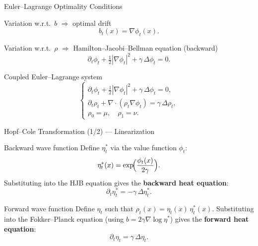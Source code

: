 \documentclass[aspectratio=169]{beamer}
\begin{document}
\begin{frame}{Euler–Lagrange Optimality Conditions}

\begin{block}{Variation w.r.t.\ $b$ $\Rightarrow$ optimal drift}
\[
    b_t(x) = \nabla\phi_t(x).
\]
\end{block}

\begin{block}{Variation w.r.t.\ $\rho$ $\Rightarrow$ Hamilton–Jacobi–Bellman equation (backward)}
\[
    \partial_t\phi_t + \tfrac{1}{2}|\nabla\phi_t|^2 + \gamma\,\Delta\phi_t = 0.
\]
\end{block}

\begin{block}{Coupled Euler–Lagrange system}
\[
\begin{cases}
\displaystyle\partial_t\phi_t + \tfrac{1}{2}|\nabla\phi_t|^2 + \gamma\,\Delta\phi_t = 0, \\[6pt]
\displaystyle\partial_t\rho_t + \nabla\cdot(\rho_t\nabla\phi_t) = \gamma\,\Delta\rho_t, \\[4pt]
\rho_0 = \mu,\quad \rho_1 = \nu.
\end{cases}
\]
\end{block}

\end{frame}

\begin{frame}{Hopf–Cole Transformation (1/2) — Linearization}

\begin{block}{Backward wave function}
Define $\eta^*_t$ via the value function $\phi_t$:
\[
    \eta^*_t(x) = \exp\!\Bigl(\frac{\phi_t(x)}{2\gamma}\Bigr).
\]
Substituting into the HJB equation gives the \textbf{backward heat equation}:
\[
    \partial_t \eta^*_t = -\gamma\,\Delta\eta^*_t.
\]
\end{block}

\begin{block}{Forward wave function}
Define $\eta_t$ such that $\rho_t(x) = \eta_t(x)\,\eta^*_t(x)$.
Substituting into the Fokker–Planck equation (using $b = 2\gamma\nabla\log\eta^*$) gives the \textbf{forward heat equation}:
\[
    \partial_t \eta_t = \gamma\,\Delta\eta_t.
\]
\end{block}

\end{frame}
\end{document}
